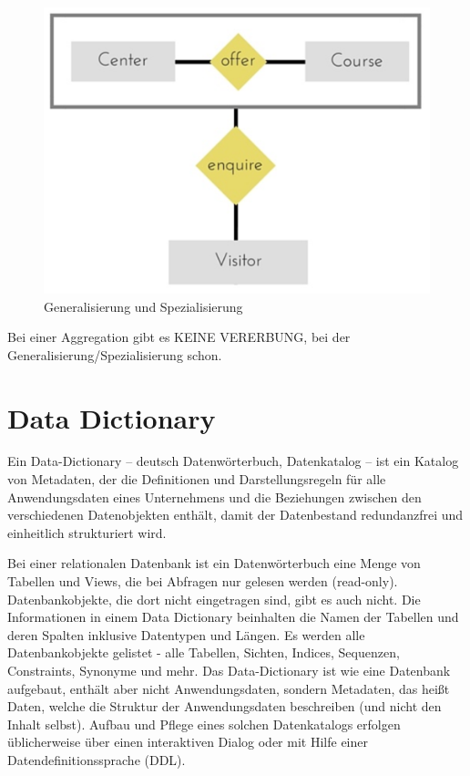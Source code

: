 \begin{figure}[H]
    \centering
    \includegraphics[width=.8\textwidth]{Content/images/modellierung/spez.png}
    \caption{Generalisierung und Spezialisierung}
    \label{fig:modellierung:special}
\end{figure}

Bei einer Aggregation gibt es KEINE VERERBUNG, bei der Generalisierung/Spezialisierung schon.

\section{Data Dictionary}

Ein Data-Dictionary – deutsch Datenwörterbuch, Datenkatalog – ist ein Katalog von Metadaten, der die Definitionen und Darstellungsregeln für alle Anwendungsdaten eines Unternehmens und die Beziehungen zwischen den verschiedenen Datenobjekten enthält, damit der Datenbestand redundanzfrei und einheitlich strukturiert wird. 

Bei einer relationalen Datenbank ist ein Datenwörterbuch eine Menge von Tabellen und Views, die bei Abfragen nur gelesen werden (read-only). Datenbankobjekte, die dort nicht eingetragen sind, gibt es auch nicht. Die Informationen in einem Data Dictionary beinhalten die Namen der Tabellen und deren Spalten inklusive Datentypen und Längen. Es werden alle Datenbankobjekte gelistet - alle Tabellen, Sichten, Indices, Sequenzen, Constraints, Synonyme und mehr. Das Data-Dictionary ist wie eine Datenbank aufgebaut, enthält aber nicht Anwendungsdaten, sondern Metadaten, das heißt Daten, welche die Struktur der Anwendungsdaten beschreiben (und nicht den Inhalt selbst). Aufbau und Pflege eines solchen Datenkatalogs erfolgen üblicherweise über einen interaktiven Dialog oder mit Hilfe einer Datendefinitionssprache (DDL).

